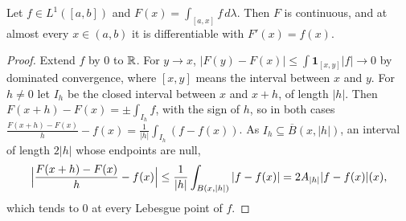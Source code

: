 \begin{corollary}\label{measure-theory:corollary-ftc-lebesgue}
Let $f \in L^1([a, b])$ and $F(x) = \int_{[a, x]}f\,d\lambda$. Then $F$ is continuous, and at almost every $x \in (a, b)$ it is differentiable with $F'(x) = f(x)$.
\end{corollary}

\begin{proof}
Extend $f$ by $0$ to $\mathbb{R}$. For $y \to x$, $|F(y) - F(x)| \leq \int\mathbf{1}_{[x, y]}|f| \to 0$ by dominated convergence, where $[x, y]$ means the interval between
$x$ and $y$. For $h \neq 0$ let $I_h$ be the closed interval between $x$ and $x + h$, of length $|h|$. Then $F(x + h) - F(x) = \pm\int_{I_h}f$, with the sign of
$h$, so in both cases $\frac{F(x + h) - F(x)}{h} - f(x) = \frac{1}{|h|}\int_{I_h}(f - f(x))$. As $I_h \subseteq \overline{B}(x, |h|)$, an interval of length $2|h|$
whose endpoints are null,
\[
\Bigl|\frac{F(x + h) - F(x)}{h} - f(x)\Bigr| \leq \frac{1}{|h|}\int_{B(x, |h|)}|f - f(x)| = 2A_{|h|}|f - f(x)|(x),
\]
which tends to $0$ at every Lebesgue point of $f$.
\end{proof}

